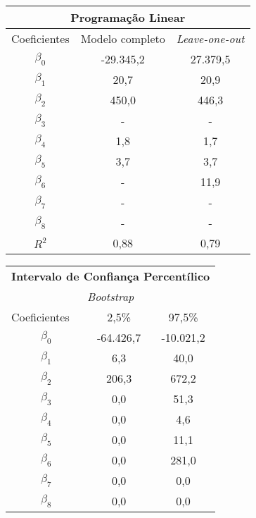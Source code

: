 \documentclass{article}
\begin{document}
\begin{table}[]
	\centering
	\begin{tabular}{ccc}
		\hline
		\multicolumn{3}{c}{\textbf{Programação Linear}}                             \\ \hline
		\multicolumn{1}{l}{Coeficientes} & Modelo completo & \textit{Leave-one-out} \\ \hline
		$\beta_0$                        & -29.345,2       & 27.379,5               \\
		$\beta_1$                        & 20,7           & 20,9                   \\
		$\beta_2$                        & 450,0           & 446,3                  \\
		$\beta_3$                        & -             & -                   \\
		$\beta_4$                        & 1,8             & 1,7                   \\
		$\beta_5$                        & 3,7             & 3,7                    \\
		$\beta_6$                        & -             & 11,9              \\
		$\beta_7$                        & -             & -                   \\
		$\beta_8$                        & -             & -                   \\ \hline
		$R^{2}$                          & 0,88             & 0,79                    \\ \hline  \hline
	\end{tabular}
\end{table}


\begin{table}[]
	\centering
	\begin{tabular}{ccc}
		\hline
		\multicolumn{3}{c}{\textbf{Intervalo de Confiança Percentílico}} \\ 
		\multicolumn{3}{c}{\textit{Bootstrap}}                           \\ \hline \hline
		\multicolumn{1}{l}{Coeficientes}    & 2,5\%        & 97,5\%      \\ \hline
		$\beta_0$                           & -64.426,7    & -10.021,2   \\
		$\beta_1$                           & 6,3          & 40,0        \\
		$\beta_2$                           & 206,3        & 672,2       \\
		$\beta_3$                           & 0,0          & 51,3        \\
		$\beta_4$                           & 0,0          & 4,6         \\
		$\beta_5$                           & 0,0          & 11,1        \\
		$\beta_6$                           & 0,0          & 281,0       \\
		$\beta_7$                           & 0,0          & 0,0         \\
		$\beta_8$                           & 0,0          & 0,0         \\ \hline
	\end{tabular}
\end{table}
\end{document}
